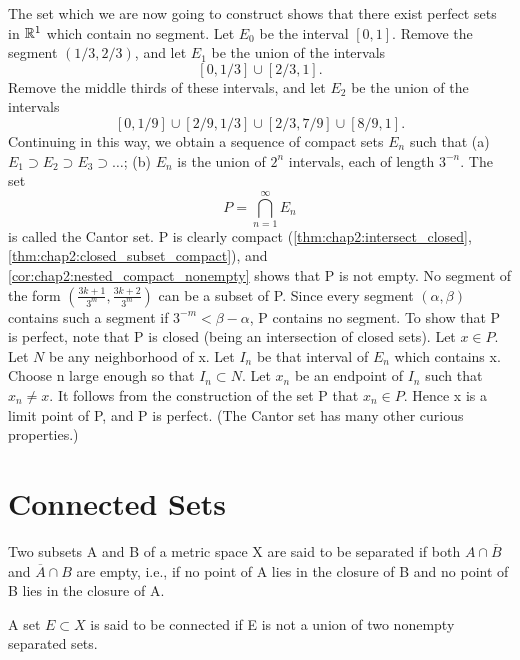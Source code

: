 \begin{example} %
  \label{ex:chap2:cantor_set}
  The set which we are now going to construct shows that there exist
  perfect sets in $\mathbb{R}^1$ which contain no segment.
  Let $E_0$ be the interval $[0, 1]$. Remove the segment $(1/3,
  2/3)$, and let $E_1$ be the union of the intervals
  \[ [0, 1/3] \cup [2/3, 1]. \]
  Remove the middle thirds of these intervals, and let $E_2$ be the
  union of the intervals
  \[ [0, 1/9] \cup [2/9, 1/3] \cup [2/3, 7/9] \cup [8/9, 1]. \]
  Continuing in this way, we obtain a sequence of compact sets $E_n$ such that
  (a) $E_1 \supset E_2 \supset E_3 \supset \dots$;
  (b) $E_n$ is the union of $2^n$ intervals, each of length $3^{-n}$.
  The set
  \[ P = \bigcap_{n=1}^\infty E_n \]
  is called the Cantor set. P is clearly compact
  (\autoref{thm:chap2:intersect_closed},
  \autoref{thm:chap2:closed_subset_compact}), and
  \autoref{cor:chap2:nested_compact_nonempty} shows that P is not empty.
  No segment of the form $(\frac{3k+1}{3^m}, \frac{3k+2}{3^m})$ can
  be a subset of P. Since every segment $(\alpha, \beta)$ contains
  such a segment if $3^{-m} < \beta - \alpha$, P contains no segment.
  To show that P is perfect, note that P is closed (being an
  intersection of closed sets). Let $x \in P$. Let $N$ be any
  neighborhood of x. Let $I_n$ be that interval of $E_n$ which
  contains x. Choose n large enough so that $I_n \subset N$. Let
  $x_n$ be an endpoint of $I_n$ such that $x_n \ne x$. It follows
  from the construction of the set P that $x_n \in P$. Hence x is a
  limit point of P, and P is perfect.
  (The Cantor set has many other curious properties.)
\end{example}

\section{Connected Sets}
\label{sec:chap2:connected_sets}

\begin{definition} %
  \label{def:chap2:separated_sets}
  Two subsets A and B of a metric space X are said to be separated if
  both $A \cap \overline{B}$ and $\overline{A} \cap B$ are empty,
  i.e., if no point of A lies in the closure of B and no point of B
  lies in the closure of A.
\end{definition}

\begin{definition} %
  \label{def:chap2:connected_set}
  A set $E \subset X$ is said to be connected if E is not a union of
  two nonempty separated sets.
\end{definition}

